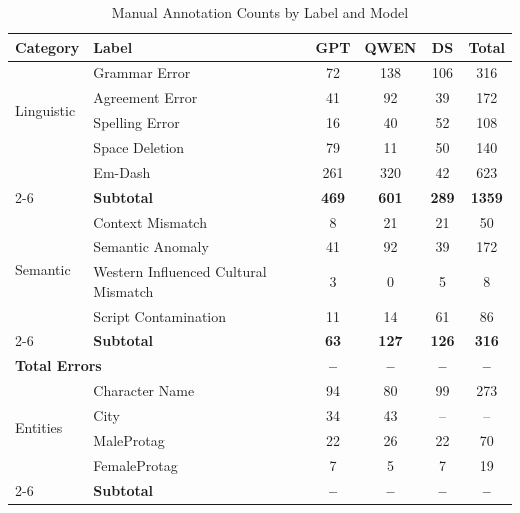 \documentclass[11pt]{article}
\begin{document}
\begin{table}[htbp]
\centering
\caption{Manual Annotation Counts by Label and Model}
\label{tab:error_summary}
\begin{tabular}{llcccc}
\hline
\textbf{Category} &
\textbf{Label} &
\textbf{GPT} &
\textbf{QWEN} &
\textbf{DS} &
\textbf{Total} \\
\hline
\multirow{4}{*}{Linguistic}
  & Grammar Error & 72  & 138 & 106  & 316 \\
  & Agreement Error     & 41   & 92   & 39   & 172   \\
  & Spelling Error      & 16  & 40  & 52  & 108  \\
  & Space Deletion      & 79  & 11   & 50  & 140  \\
  & Em-Dash      & 261  & 320   & 42  & 623  \\
  

\cline{2-6}
  & \textbf{Subtotal}   & \textbf{469} & \textbf{601} 
                        & \textbf{289} & \textbf{1359} \\
\hline
\multirow{4}{*}{Semantic}
 
  & Context Mismatch    & 8  & 21  & 21  & 50  \\
  & Semantic Anomaly             & 41  & 92  & 39   & 172  \\
  & Western Influenced Cultural Mismatch            & 3  & 0  & 5   & 8  \\
  & Script Contamination             & 11  & 14  & 61   & 86  \\
  
\cline{2-6}
  & \textbf{Subtotal}   & \textbf{63} & \textbf{127} 
                        & \textbf{126} & \textbf{316} \\
\hline

\hline
\multicolumn{2}{l}{\textbf{Total Errors}}
  & \textbf{--} & \textbf{--} 
  & \textbf{--} & \textbf{--} \\
\hline
\multirow{4}{*}{Entities}
  & Character Name                & 94  & 80  & 99  & 273 \\
  & City                & 34  & 43  & --  & --  \\
  & MaleProtag     & 22   & 26   & 22   & 70   \\
  & FemaleProtag     & 7   & 5   & 7   & 19   \\
\cline{2-6}
  & \textbf{Subtotal}   & \textbf{--} & \textbf{--} 
                        & \textbf{--} & \textbf{--} \\
\hline
\end{tabular}
\end{table}
\end{document}
